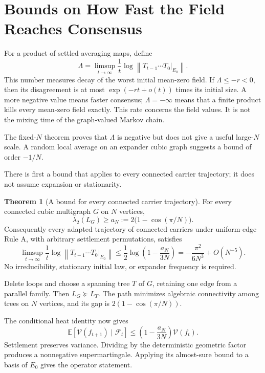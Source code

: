 \documentclass[11pt]{article}
\makeatletter
\newcommand{\E}{\mathbb E}
\newcommand{\V}{\mathcal V}
\newcommand{\norm}[1]{\left\|#1\right\|}
\theoremstyle{definition}
\newtheorem{theorem}{Theorem}
\renewenvironment{proof}[1][\proofname]{\par
  \pushQED{\qed}%
  \normalfont \topsep6\p@\@plus6\p@\relax
  \trivlist
  \item[\hskip\labelsep\bfseries #1\@addpunct{.}]\ignorespaces
}{%
  \popQED\endtrivlist\@endpefalse
}
\makeatother
\begin{document}
\section{Bounds on How Fast the Field Reaches Consensus}

For a product of settled averaging maps, define
\[
 \Lambda=\limsup_{t\to\infty}\frac1t
 \log\norm{T_{t-1}\cdots T_0|_{E_0}}.
\]
This number measures decay of the worst initial mean-zero field.  If
$\Lambda\le-r<0$, then its disagreement is at most
$\exp(-rt+o(t))$ times its initial size.  A more negative value means faster
consensus; $\Lambda=-\infty$ means that a finite product kills every mean-zero
field exactly.  This rate concerns the field values.  It is not the mixing time
of the graph-valued Markov chain.

The fixed-$N$ theorem proves that $\Lambda$ is negative but does not give a
useful large-$N$ scale.  A random local average on an expander cubic graph
suggests a bound of order $-1/N$.

There is first a bound that applies to every connected carrier trajectory; it
does not assume expansion or stationarity.

\begin{theorem}[A bound for every connected carrier trajectory]
For every connected cubic multigraph $G$ on $N$ vertices,
\[
    \lambda_2(L_G)\ge
    a_N:=2\bigl(1-\cos(\pi/N)\bigr).
\]
Consequently every adapted trajectory of connected carriers under uniform-edge
Rule A, with arbitrary settlement permutations, satisfies
\[
    \limsup_{t\to\infty}\frac1t
    \log\norm{T_{t-1}\cdots T_0|_{E_0}}
    \le \frac12\log\left(1-\frac{a_N}{3N}\right)
    =-\frac{\pi^2}{6N^3}+O(N^{-5}).
\]
No irreducibility, stationary initial law, or expander frequency is required.
\end{theorem}

\begin{proof}
Delete loops and choose a spanning tree $T$ of $G$, retaining one edge from a
parallel family.  Then $L_G\succeq L_T$.  The path minimizes algebraic
connectivity among trees on $N$ vertices, and its gap is
$2(1-\cos(\pi/N))$.

The conditional heat identity now gives
\[
  \E[\V(f_{t+1})\mid\mathcal F_t]
  \le\left(1-\frac{a_N}{3N}\right)\V(f_t).
\]
Settlement preserves variance.  Dividing by the deterministic geometric
factor produces a nonnegative supermartingale.  Applying its almost-sure
bound to a basis of $E_0$ gives the operator statement.
\end{proof}
\end{document}
